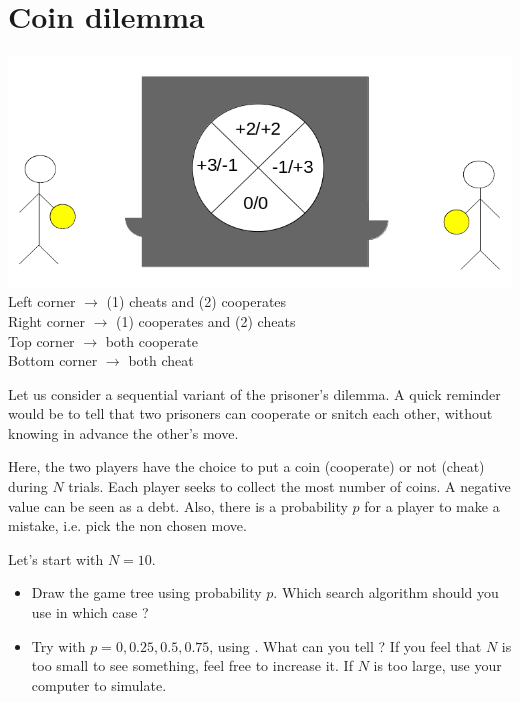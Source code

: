 \documentclass[11pt,a4paper,BCOR12mm, headexclude, footexclude, twoside, openright]{scrartcl}
\numberwithin{equation}{section} %
\numberwithin{figure}{section} %
\numberwithin{table}{section} %
\begin{document}
\section{Coin dilemma}

\begin{center}
\includegraphics[scale=0.5]{coin_game.png}\\
Left corner $\rightarrow$ (1) cheats and (2) cooperates\\
Right corner $\rightarrow$ (1) cooperates and (2) cheats\\
Top corner $\rightarrow$ both cooperate\\
Bottom corner $\rightarrow$ both cheat\\
\end{center}
Let us consider a sequential variant of the prisoner's dilemma. A quick reminder would be to tell that two prisoners can cooperate or snitch each other, without knowing in advance the other's move.

Here, the two players have the choice to put a coin (cooperate) or not (cheat) during $N$ trials. Each player seeks to collect the most number of coins. A negative value can be seen as a debt. Also, there is a probability $p$ for a player to make a mistake, i.e. pick the non chosen move.

Let's start with $N = 10$.

\begin{itemize}
	\item Draw the game tree using probability $p$. Which search algorithm should you use in which case ?
	\item Try with $p = 0,0.25,0.5,0.75$, using . What can you tell ? If you feel that $N$ is too small to see something, feel free to increase it. If $N$ is too large, use your computer to simulate.  
\end{itemize}
\end{document}
